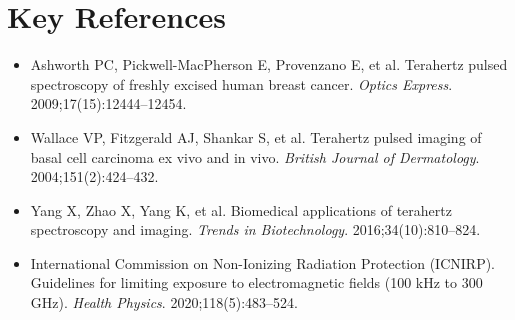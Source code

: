 \section{Key References}
\begin{itemize}
  \item Ashworth PC, Pickwell-MacPherson E, Provenzano E, et al. Terahertz pulsed spectroscopy of freshly excised human breast cancer. \emph{Optics Express}. 2009;17(15):12444--12454.
  \item Wallace VP, Fitzgerald AJ, Shankar S, et al. Terahertz pulsed imaging of basal cell carcinoma ex vivo and in vivo. \emph{British Journal of Dermatology}. 2004;151(2):424--432.
  \item Yang X, Zhao X, Yang K, et al. Biomedical applications of terahertz spectroscopy and imaging. \emph{Trends in Biotechnology}. 2016;34(10):810--824.
  \item International Commission on Non-Ionizing Radiation Protection (ICNIRP). Guidelines for limiting exposure to electromagnetic fields (100 kHz to 300 GHz). \emph{Health Physics}. 2020;118(5):483--524.
\end{itemize}
